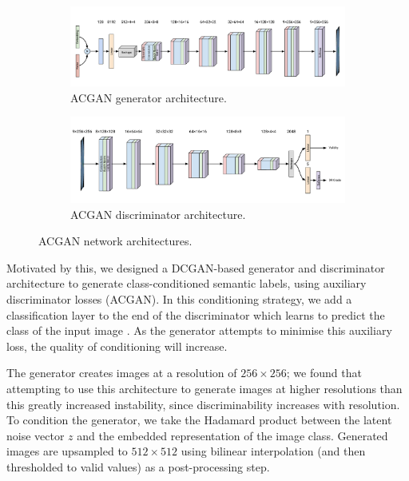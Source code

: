 \begin{figure}
    \centering
    \begin{subfigure}{\textwidth}
        \centering
        \includegraphics[width=\linewidth]{labels/figs/acgan-generator.pdf}
        \caption{ACGAN generator architecture.}
        \label{fig:acgan_gen}
    \end{subfigure}
    \begin{subfigure}{\textwidth}
        \centering
        \includegraphics[width=\linewidth]{labels/figs/acgan-discriminator.pdf}
        \caption{ACGAN discriminator architecture.}
        \label{fig:acgan_dis}
    \end{subfigure}
    \caption{ACGAN network architectures.}
    \label{fig:acgan_arch}
\end{figure}

Motivated by this, we designed a DCGAN-based generator and discriminator architecture to generate class-conditioned semantic labels, using auxiliary discriminator losses (ACGAN).
In this conditioning strategy, we add a classification layer to the end of the discriminator which learns to predict the class of the input image \cite{odena2017conditional}.
As the generator attempts to minimise this auxiliary loss, the quality of conditioning will increase.

The generator creates images at a resolution of $256 \times 256$;  we found that attempting to use this architecture to generate images at higher resolutions than this greatly increased instability, since discriminability increases with resolution.
To condition the generator, we take the Hadamard product between the latent noise vector $z$ and the embedded representation of the image class.
Generated images are upsampled to $512 \times 512$ using bilinear interpolation (and then thresholded to valid values) as a post-processing step.

